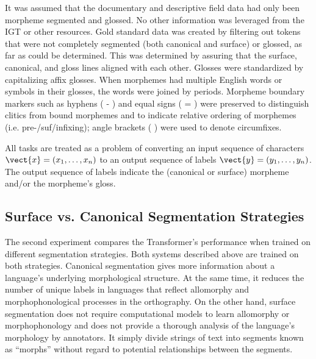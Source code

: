 It was assumed that the documentary and descriptive field data had only been morpheme segmented and glossed. No other information was leveraged from the IGT or other resources. Gold standard data was created by filtering out tokens that were not completely segmented (both canonical and surface) or glossed, as far as could be determined. This was determined by assuring that the surface, canonical, and gloss lines aligned with each other. 
Glosses were standardized by capitalizing affix glosses. When morphemes had multiple English words or symbols in their glosses, the words were joined by periods.
Morpheme boundary markers such as hyphens ( - ) and equal signs ( = ) were preserved to distinguish clitics from bound morphemes and to indicate relative ordering of morphemes (i.e. pre-/suf/infixing); angle brackets ( \textlangle{}\textrangle{} ) were used to denote circumfixes. 

All tasks are treated as a problem of converting an input sequence of characters $\vect{x} = (x_1, \ldots, x_n)$ to an output sequence of labels $\vect{y} = (y_1, \ldots, y_n)$. The output sequence of labels indicate the (canonical or surface) morpheme and/or the morpheme's gloss. 

\subsection{Surface vs. Canonical Segmentation Strategies}
\label{sec:strategies}

The second experiment compares the Transformer's performance when trained on different segmentation strategies. Both systems described above are trained on both strategies. Canonical segmentation gives more information about a language's underlying morphological structure. At the same time, it reduces the number of unique labels in languages that reflect allomorphy and morphophonological processes in the orthography. On the other hand, surface segmentation does not require computational models to learn allomorphy or morphophonology \citep{goldsmith_computational_2017} and does not provide a thorough analysis of the language's morphology by annotators. It simply divide strings of text into segments known as ``morphs'' \citep{virpioja_empirical_2011} without regard to potential relationships between the segments. 

